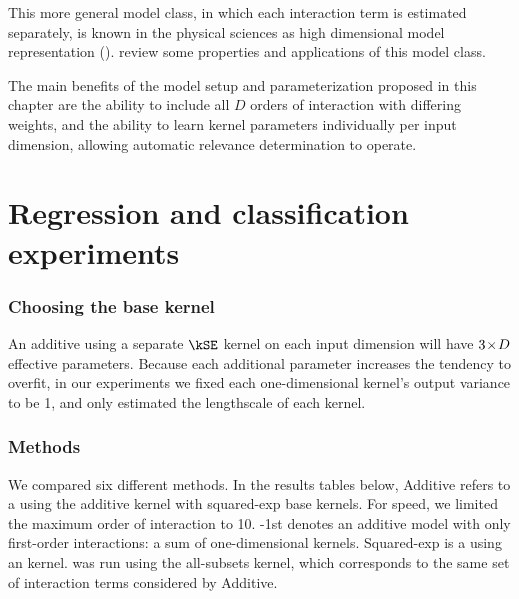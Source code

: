 This more general model class, in which each interaction term is estimated separately, is known in the physical sciences as high dimensional model representation (\HDMR{}).
\citet{rabitz1999general} review some properties and applications of this model class.

The main benefits of the model setup and parameterization proposed in this chapter are the ability to include all $D$ orders of interaction with differing weights, and the ability to learn kernel parameters individually per input dimension, allowing automatic relevance determination to operate.




\section{Regression and classification experiments}
\label{sec:additive-experiments}

\subsubsection{Choosing the base kernel}
An additive \gp{} using a separate $\kSE$ kernel on each input dimension will have ${3 \! \times \! D}$ effective parameters.
Because each additional parameter increases the tendency to overfit, %
%
%
in our experiments we fixed each one-dimensional kernel's output variance to be 1, and only estimated the lengthscale of each kernel.



\subsubsection{Methods}

We compared six different methods.
In the results tables below, \gp{} Additive refers to a \gp{} using the additive kernel with squared-exp base kernels.
For speed, we limited the maximum order of interaction to 10.
\gp{}-1st denotes an additive \gp{} model with only first-order interactions: a sum of one-dimensional kernels.
\gp{} Squared-exp is a \gp{} using an \seard{} kernel.
\HKL{} was run using the all-subsets kernel, which corresponds to the same set of interaction terms considered by \gp{} Additive.

